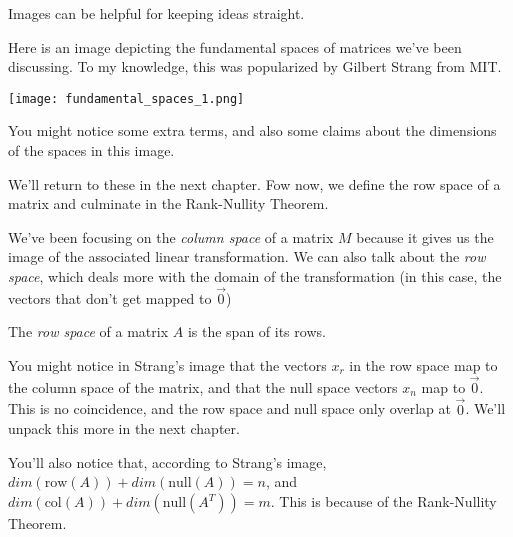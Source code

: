 \documentclass{ximera}
\begin{document}
\begin{remark}

  Images can be helpful for keeping ideas straight. 

  Here is an image depicting the fundamental spaces of matrices we've been discussing. To my knowledge, this was popularized by Gilbert Strang from MIT.

  

\begin{center}
  \texttt{[image: fundamental\_spaces\_1.png]}
\end{center}

\end{remark}



You might notice some extra terms, and also some claims about the dimensions of the spaces in this image.

We'll return to these in the next chapter. Fow now, we define the row space of a matrix and culminate in the Rank-Nullity Theorem.

We've been focusing on the \emph{column space} of a matrix $M$ because it gives us the image of the associated linear transformation. We can also talk about the \emph{row space}, which deals more with the domain of the transformation (in this case, the vectors that don't get mapped to $\vec{0}$)

\begin{definition}

  The \emph{row space} of a matrix $A$ is the span of its rows. 

\end{definition}



\begin{remark}

  You might notice in Strang's image that the vectors $x_r$ in the row space map to the column space of the matrix, and that the null space vectors $x_n$ map to $\vec{0}$. This is no coincidence, and the row space and null space only overlap at  $\vec{0}$. We'll unpack this more in the next chapter.

\end{remark}
 
You'll also notice that, according to Strang's image, $dim(\mbox{row}(A))+dim(\mbox{null}(A))=n$, and $dim(\mbox{col}(A))+dim(\mbox{null}(A^T))=m$. This is because of the Rank-Nullity Theorem.
\end{document}
